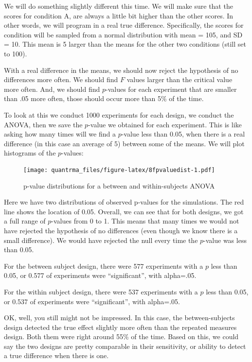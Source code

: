 \documentclass[
]{book}
\begin{document}
We will do something slightly different this time. We will make sure that the scores for condition A, are always a little bit higher than the other scores. In other words, we will program in a real true difference. Specifically, the scores for condition will be sampled from a normal distribution with mean = 105, and SD = 10. This mean is 5 larger than the means for the other two conditions (still set to 100).

With a real difference in the means, we should now reject the hypothesis of no differences more often. We should find \(F\) values larger than the critical value more often. And, we should find \(p\)-values for each experiment that are smaller than .05 more often, those should occur more than 5\% of the time.

To look at this we conduct 1000 experiments for each design, we conduct the ANOVA, then we save the \(p\)-value we obtained for each experiment. This is like asking how many times will we find a \(p\)-value less than 0.05, when there is a real difference (in this case an average of 5) between some of the means. We will plot histograms of the \(p\)-values:

\begin{figure}
\centering
\texttt{[image: quantrma\_files/figure-latex/8fpvaluedist-1.pdf]}
\caption{\label{fig:8fpvaluedist}p-value distributions for a between and within-subjects ANOVA}
\end{figure}

Here we have two distributions of observed p-values for the simulations. The red line shows the location of 0.05. Overall, we can see that for both designs, we got a full range of \(p\)-values from 0 to 1. This means that many times we would not have rejected the hypothesis of no differences (even though we know there is a small difference). We would have rejected the null every time the \(p\)-value was less than 0.05.

For the between subject design, there were 577 experiments with a \(p\) less than 0.05, or 0.577 of experiments were ``significant'', with alpha=.05.

For the within subject design, there were 537 experiments with a \(p\) less than 0.05, or 0.537 of experiments were ``significant'', with alpha=.05.

OK, well, you still might not be impressed. In this case, the between-subjects design detected the true effect slightly more often than the repeated measures design. Both them were right around 55\% of the time. Based on this, we could say the two designs are pretty comparable in their sensitivity, or ability to detect a true difference when there is one.
\end{document}

